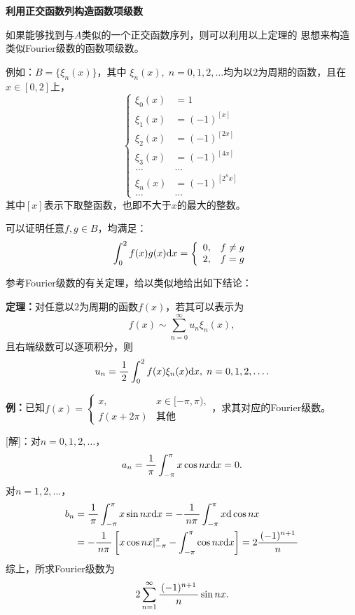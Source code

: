 \begin{shaded}
	{\bf 利用正交函数列构造函数项级数}
	
	如果能够找到与$A$类似的一个正交函数序列，则可以利用以上定理的
	思想来构造类似Fourier级数的函数项级数。
	
	例如：$B=\{\xi_n(x)\}$，其中
	$\xi_n(x),\;n=0,1,2,\ldots$均为以$2$为周期的函数，且在$x\in[0,2]$上，
	$$
		\left\{\begin{array}{rl}
			\xi_0(x)&=1\\
			\xi_1(x)&=(-1)^{[x]}\\
			\xi_2(x)&=(-1)^{[2x]}\\
			\xi_3(x)&=(-1)^{[4x]}\\
			\ldots&\ldots\\
			\xi_n(x)&=(-1)^{[2^nx]}\\
			\ldots&\ldots
		\end{array}\right.
	$$
	其中$[x]$表示下取整函数，也即不大于$x$的最大的整数。
	
	可以证明任意$f,g\in B$，均满足：
	$$\displaystyle\int_0^{2}f(x)g(x)\mathrm{d} x=
	\left\{\begin{array}{ll}
		0,& f\ne g\\ 2,& f=g
	\end{array}\right.$$
	
	参考Fourier级数的有关定理，给以类似地给出如下结论：
	
	\begin{tcolorbox}
		{\bf 定理：}对任意以$2$为周期的函数$f(x)$，若其可以表示为
		$$f(x)\sim\sum\limits_{n=0}^{\infty}u_n\xi_n(x),$$
		且右端级数可以逐项积分，则
		$$
		u_n=\displaystyle\frac{\,{1}\,}{\,{2}\,}\displaystyle\int_0^2f(x)\xi_n(x)\mathrm{d} x,\;n=0,1,2,\ldots.
		$$
	\end{tcolorbox}
\end{shaded}

{\bf 例：}已知$f(x)=\left\{\begin{array}{ll}
	x,& x\in[-\pi,\pi),\\ f(x+2\pi)& \mbox{其他}
\end{array}\right.$，求其对应的Fourier级数。

[解]：对$n=0,1,2,\ldots$，
$$a_n=\displaystyle\frac{\,{1}\,}{\,{\pi}\,}\displaystyle\int_{-\pi}^{\pi}x\cos nx\mathrm{d} x=0.$$
对$n=1,2,\ldots$，
\begin{align*}
	b_n&=\displaystyle\frac{\,{1}\,}{\,{\pi}\,}\displaystyle\int_{-\pi}^{\pi}x\sin nx\mathrm{d} x
	=-\displaystyle\frac{\,{1}\,}{\,{n\pi}\,}\displaystyle\int_{-\pi}^{\pi}x\mathrm{d}\cos nx\\
	&=-\displaystyle\frac{\,{1}\,}{\,{n\pi}\,}\left[x\cos nx|_{-\pi}^{\pi}
	-\displaystyle\int_{-\pi}^{\pi}\cos nx\mathrm{d} x\right]=2\displaystyle\frac{\,{(-1)^{n+1}}\,}{\,{n}\,}
\end{align*}
综上，所求Fourier级数为
$$2\sum\limits_{n=1}^{\infty}\displaystyle\frac{\,{(-1)^{n+1}}\,}{\,{n}\,}\sin nx.$$
\fin

